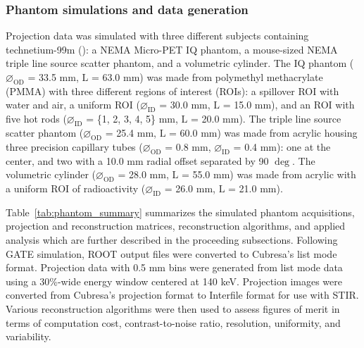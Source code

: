 \documentclass[utf8]{FrontiersinHarvard} %
\begin{document}
\subsubsection{Phantom simulations and data generation}

Projection data was simulated with three different subjects containing technetium-99m (): a NEMA Micro-PET IQ phantom, a mouse-sized NEMA triple line source scatter phantom, and a volumetric cylinder. The IQ phantom ($\diameter_{\mathrm{OD}}$ = 33.5 mm, $\mathrm{L}$ = 63.0 mm) was made from polymethyl methacrylate (PMMA) with three different regions of interest (ROIs): a spillover ROI with water and air, a uniform ROI ($\diameter_{\mathrm{ID}}$ = 30.0 mm, $\mathrm{L}$ = 15.0 mm), and an ROI with five hot rods ($\diameter_{\mathrm{ID}}$ = \{1, 2, 3, 4, 5\} mm, $\mathrm{L}$ = 20.0 mm). The triple line source scatter phantom ($\diameter_{\mathrm{OD}}$ = 25.4 mm, $\mathrm{L}$ = 60.0 mm) was made from acrylic housing three precision capillary tubes ($\diameter_{\mathrm{OD}}$ = 0.8 mm, $\diameter_{\mathrm{ID}}$ = 0.4 mm): one at the center, and two with a 10.0 mm radial offset separated by 90 $\deg$. The volumetric cylinder ($\diameter_{\mathrm{OD}}$ = 28.0 mm, $\mathrm{L}$ = 55.0 mm) was made from acrylic with a uniform ROI of radioactivity ($\diameter_{\mathrm{ID}}$ = 26.0 mm, $\mathrm{L}$ = 21.0 mm). 

Table~\ref{tab:phantom_summary} summarizes the simulated phantom acquisitions, projection and reconstruction matrices, reconstruction algorithms, and applied analysis which are further described in the proceeding subsections. Following GATE simulation, ROOT output files were converted to Cubresa's list mode format. Projection data with 0.5 mm bins were generated from list mode data using a 30\%-wide energy window centered at 140 keV. Projection images were converted from Cubresa's projection format to Interfile format for use with STIR. Various reconstruction algorithms were then used to assess figures of merit in terms of computation cost, contrast-to-noise ratio, resolution, uniformity, and variability.
\end{document}

